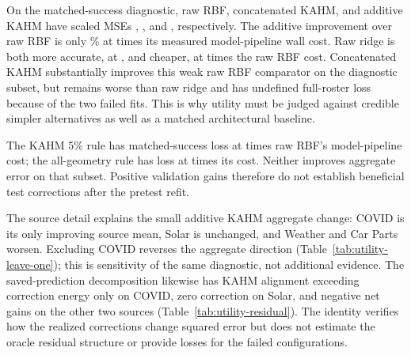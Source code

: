 On the matched-success diagnostic, raw RBF, concatenated KAHM, and
additive KAHM have scaled MSEs \UtilityRawLoss{}, \UtilityConcatLoss{},
and \UtilityKAHMLoss{}, respectively. The additive improvement over
raw RBF is only \UtilityKAHMGainPercent\% at
\UtilityKAHMCostRatio{} times its measured model-pipeline wall cost.
Raw ridge is both more accurate, at \UtilityRidgeLoss{}, and cheaper,
at \UtilityRidgeCostRatio{} times the raw RBF cost. Concatenated KAHM
substantially improves this weak raw RBF comparator on the diagnostic
subset, but remains worse than raw ridge and has undefined full-roster
loss because of the two failed fits. This is why utility must be judged
against credible simpler alternatives as well as a matched architectural
baseline.

The KAHM 5\% rule has matched-success loss \UtilityPolicyLoss{} at
\UtilityPolicyCostRatio{} times raw RBF's model-pipeline cost; the
all-geometry rule has loss \UtilityGeometryPolicyLoss{} at
\UtilityGeometryPolicyCostRatio{} times its cost. Neither improves
aggregate error on that subset. Positive validation gains therefore do
not establish beneficial test corrections after the pretest refit.

The source detail explains the small additive KAHM aggregate change:
COVID is its only improving source mean, Solar is unchanged, and Weather
and Car Parts worsen. Excluding COVID reverses the aggregate direction
(Table~\ref{tab:utility-leave-one}); this is sensitivity of the same
diagnostic, not additional evidence. The saved-prediction decomposition
likewise has KAHM alignment exceeding correction energy only on COVID,
zero correction on Solar, and negative net gains on the other two sources
(Table~\ref{tab:utility-residual}). The identity verifies how the realized
corrections change squared error but does not estimate the oracle residual structure or provide losses
for the failed configurations.
